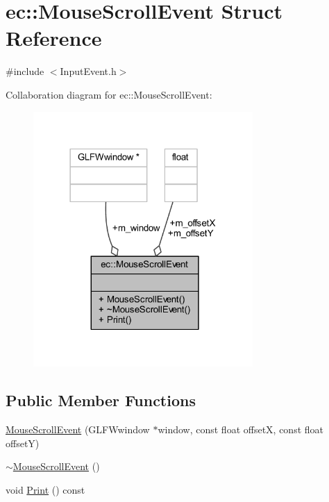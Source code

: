 \hypertarget{structec_1_1_mouse_scroll_event}{}\section{ec\+:\+:Mouse\+Scroll\+Event Struct Reference}
\label{structec_1_1_mouse_scroll_event}


{\ttfamily \#include $<$Input\+Event.\+h$>$}



Collaboration diagram for ec\+:\+:Mouse\+Scroll\+Event\+:\nopagebreak
\begin{figure}[H]
\begin{center}
\leavevmode
\includegraphics[width=237pt]{structec_1_1_mouse_scroll_event__coll__graph}
\end{center}
\end{figure}
\subsection*{Public Member Functions}
\begin{DoxyCompactItemize}
\item 
\mbox{\hyperlink{structec_1_1_mouse_scroll_event_a3bccf854cfd63d44a49db296fc88b8dd}{Mouse\+Scroll\+Event}} (G\+L\+F\+Wwindow $\ast$window, const float offsetX, const float offsetY)
\item 
\mbox{\hyperlink{structec_1_1_mouse_scroll_event_a253aa9552ed33bc767b64057c0d4a457}{$\sim$\+Mouse\+Scroll\+Event}} ()
\item 
void \mbox{\hyperlink{structec_1_1_mouse_scroll_event_a32d077172f91f04909d469e070e219e6}{Print}} () const
\end{DoxyCompactItemize}

